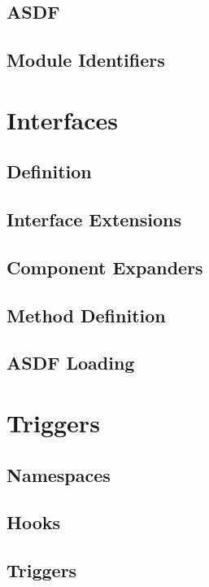 \subsection{ASDF}\label{sec:mod asdf}
\subsection{Module Identifiers}\label{sec:mod module identifiers}

\section{Interfaces}\label{sec:int interfaces}
\subsection{Definition}\label{sec:int definition}
\subsection{Interface Extensions}\label{sec:int interface extensions}
\subsection{Component Expanders}\label{sec:int component expanders}
\subsection{Method Definition}\label{sec:int method definition}
\subsection{ASDF Loading}\label{sec:int asdf loading}

\section{Triggers}\label{sec:triggers}
\subsection{Namespaces}\label{sec:trig namespaces}
\subsection{Hooks}\label{sec:trig hooks}
\subsection{Triggers}\label{sec:trig triggers}

